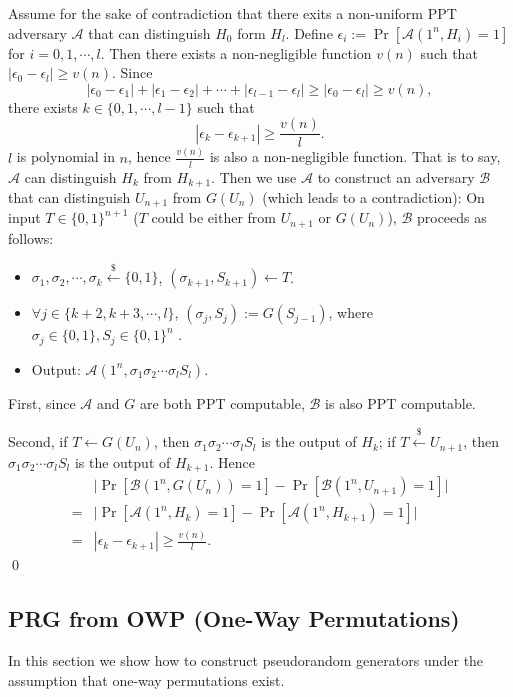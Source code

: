 \documentclass[12pt]{tufte-book}
\newcommand{\ma}{\mathcal{A}}
\begin{document}
Assume for the sake of contradiction that there exits a non-uniform PPT adversary $\ma$ that can distinguish $H_0$ form $H_l$.
Define $\epsilon_i := \Pr[\ma(1^n, H_i)=1]$ for $i = 0, 1, \cdots, l$.
Then there exists a non-negligible function $v(n)$ such that $|\epsilon_0 - \epsilon_l| \geq v(n)$.
Since
\[
|\epsilon_0 - \epsilon_1| +
|\epsilon_1 - \epsilon_2| +
\cdots +
|\epsilon_{l-1} - \epsilon_l| \geq
|\epsilon_0 - \epsilon_l|
\geq v(n),
\]
there exists $k \in \{0, 1, \cdots, l-1\}$ such that
\[
|\epsilon_{k} - \epsilon_{k+1}| \geq \frac{v(n)}{l}.
\]
$l$ is polynomial in $n$, hence $\frac{v(n)}{l}$ is also a non-negligible function.
That is to say, $\ma$ can distinguish $H_{k}$ from $H_{k+1}$.
Then we use $\ma$ to construct an adversary $\mathcal{B}$ that can distinguish $U_{n+1}$ from $G(U_n)$ (which leads to a contradiction):
On input $T \in \{0, 1\}^{n+1}$ ($T$ could be either from $U_{n+1}$ or $G(U_n)$), $\mathcal{B}$ proceeds as follows:
\begin{itemize}
\item $\sigma_1, \sigma_2, \cdots, \sigma_k \xleftarrow{\$} \{0, 1\}$, $(\sigma_{k+1}, S_{k+1}) \gets T$.
\item $\forall j \in \{k+2, k+3, \cdots, l\}$, $(\sigma_j, S_j) := G(S_{j-1})$, where $\sigma_j \in \{0, 1\}, S_j \in \{0, 1\}^n$ .
\item Output: $\ma(1^n, \sigma_1 \sigma_2 \cdots \sigma_l S_l)$.
\end{itemize}

First, since $\ma$ and $G$ are both PPT computable, $\mathcal{B}$ is also PPT computable.

Second, if $T\gets G(U_n)$, then $\sigma_1 \sigma_2 \cdots \sigma_l S_l$ is the output of  $H_{k}$; if $T \stackrel{\$}\leftarrow U_{n+1}$, then $\sigma_1 \sigma_2 \cdots \sigma_l S_l$ is the output of $H_{k+1}$.
Hence
\begin{align*}
&\big|\Pr[\mathcal{B}(1^n, G(U_n)) = 1] - \Pr[\mathcal{B}(1^n, U_{n+1}) = 1]\big|\\
=& \big|\Pr[\ma(1^n,H_k) = 1] - \Pr[\ma(1^n,H_{k+1}) = 1]\big|\\
=&
|\epsilon_{k} - \epsilon_{k+1}| \geq \frac{v(n)}{l}.
\end{align*}
\qed

\subsection{PRG from OWP (One-Way Permutations)}
In this section we show how to construct pseudorandom generators under the assumption that one-way permutations exist.
\end{document}
